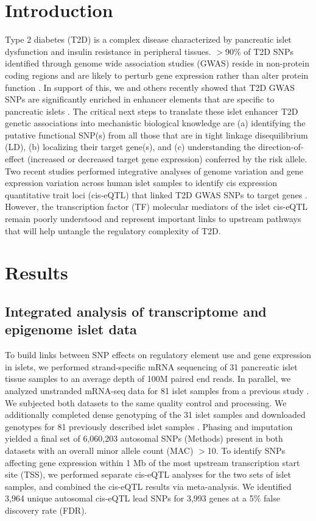 \section{Introduction}
Type 2 diabetes (T2D) is a complex disease characterized by pancreatic islet dysfunction and insulin resistance in peripheral tissues. $>$90\% of T2D SNPs identified through genome wide association studies (GWAS) reside in non-protein coding regions and are likely to perturb gene expression rather than alter protein function \cite{mohlkeRecentAdvancesUnderstanding2015}. In support of this, we and others recently showed that T2D GWAS SNPs are significantly enriched in enhancer elements that are specific to pancreatic islets \cite{parkerChromatinStretchEnhancer2013, pasqualiPancreaticIsletEnhancer2014, trynkaChromatinMarksIdentify2013}. The critical next steps to translate these islet enhancer T2D genetic associations into mechanistic biological knowledge are (a) identifying the putative functional SNP(s) from all those that are in tight linkage disequilibrium (LD), (b) localizing their target gene(s), and (c) understanding the direction-of-effect (increased or decreased target gene expression) conferred by the risk allele. Two recent studies performed integrative analyses of genome variation and gene expression variation across human islet samples to identify cis expression quantitative trait loci (cis-eQTL) that linked T2D GWAS SNPs to target genes \cite{fadistaGlobalGenomicTranscriptomic2014, buntTranscriptExpressionData2015}. However, the transcription factor (TF) molecular mediators of the islet cis-eQTL remain poorly understood and represent important links to upstream pathways that will help untangle the regulatory complexity of T2D. 

\section{Results}
\subsection{Integrated analysis of transcriptome and epigenome islet data}
To build links between SNP effects on regulatory element use and gene expression in islets, we performed strand-specific mRNA sequencing of 31 pancreatic islet tissue samples to an average depth of 100M paired end reads. In parallel, we analyzed unstranded mRNA-seq data for 81 islet samples from a previous study \cite{fadistaGlobalGenomicTranscriptomic2014}. We subjected both datasets to the same quality control and processing. We additionally completed dense genotyping of the 31 islet samples and downloaded genotypes for 81 previously described islet samples \cite{fadistaGlobalGenomicTranscriptomic2014}. Phasing and imputation yielded a final set of 6,060,203 autosomal SNPs (Methods) present in both datasets with an overall minor allele count (MAC) $>$10. To identify SNPs affecting gene expression within 1 Mb of the most upstream transcription start site (TSS), we performed separate cis-eQTL analyses for the two sets of islet samples, and combined the cis-eQTL results via meta-analysis. We identified 3,964 unique autosomal cis-eQTL lead SNPs for 3,993 genes at a 5\% false discovery rate (FDR). 

